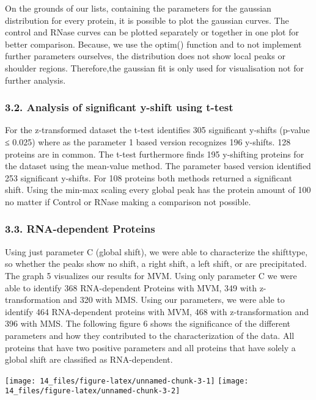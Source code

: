 \documentclass[
  12pt,
]{article}
\begin{document}
On the grounds of our lists, containing the parameters for the gaussian
distribution for every protein, it is possible to plot the gaussian
curves. The control and RNase curves can be plotted separately or
together in one plot for better comparison. Because, we use the optim()
function and to not implement further parameters ourselves, the
distribution does not show local peaks or shoulder regions.
Therefore,the gaussian fit is only used for visualisation not for
further analysis.

\hypertarget{analysis-of-significant-y-shift-using-t-test-1}{%
\subsubsection{3.2. Analysis of significant y-shift using
t-test}\label{analysis-of-significant-y-shift-using-t-test-1}}

For the z-transformed dataset the t-test identifies 305 significant
y-shifts (p-value ≤ 0.025) where as the parameter 1 based version
recognizes 196 y-shifts. 128 proteins are in common. The t-test
furthermore finds 195 y-shifting proteins for the dataset using the
mean-value method. The parameter based version identified 253
significant y-shifts. For 108 proteins both methods returned a
significant shift. Using the min-max scaling every global peak has the
protein amount of 100 no matter if Control or RNase making a comparison
not possible.

\hypertarget{rna-dependent-proteins}{%
\subsubsection{3.3. RNA-dependent
Proteins}\label{rna-dependent-proteins}}

Using just parameter C (global shift), we were able to characterize the
shifttype, so whether the peaks show no shift, a right shift, a left
shift, or are precipitated. The graph 5 visualizes our results for MVM.
Using only parameter C we were able to identify 368 RNA-dependent
Proteins with MVM, 349 with z-transformation and 320 with MMS. Using our
parameters, we were able to identify 464 RNA-dependent proteins with
MVM, 468 with z-transformation and 396 with MMS. The following figure 6
shows the significance of the different parameters and how they
contributed to the characterization of the data. All proteins that have
two positive parameters and all proteins that have solely a global shift
are classified as RNA-dependent.

\texttt{[image: 14\_files/figure-latex/unnamed-chunk-3-1]}
\texttt{[image: 14\_files/figure-latex/unnamed-chunk-3-2]}
\end{document}
